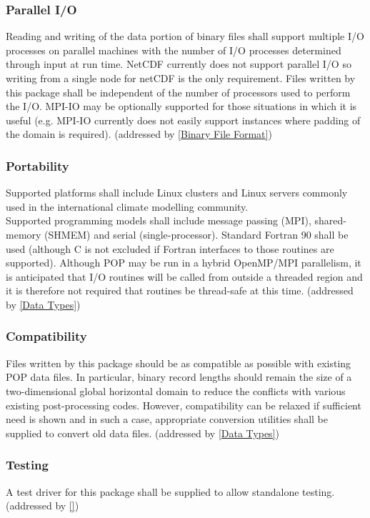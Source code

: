 \documentclass[11pt]{article}
\begin{document}
\subsubsection{Parallel I/O}
\label{Parallel I/O}
Reading and writing of the data portion of binary files
shall support multiple I/O processes on parallel machines
with the number of I/O processes determined through input at run time.
NetCDF currently does not support parallel I/O so writing
from a single node for netCDF is the only requirement.
Files written by this package shall be independent of the
number of processors used to perform the I/O.
MPI-IO may be optionally supported for those situations
in which it is useful (e.g. MPI-IO currently does not easily
support instances where padding of the domain is required).
(addressed by \ref{Binary File Format})

\subsubsection{Portability}
\label{Portability}
Supported platforms shall include Linux clusters and Linux servers
commonly used in the international climate modelling community.
\\
Supported programming models shall include message passing (MPI),
shared-memory (SHMEM) and serial (single-processor).
Standard Fortran 90 shall be used (although C is not excluded
if Fortran interfaces to those routines are supported).
Although POP may be run in a hybrid OpenMP/MPI parallelism,
it is anticipated that I/O routines will be called from
outside a threaded region and it is therefore not required
that routines be thread-safe at this time.
(addressed by \ref{Data Types})

\subsubsection{Compatibility}
\label{Compatibility}
Files written by this package should be as compatible as
possible with existing POP data files.
In particular, binary record lengths should remain the size
of a two-dimensional global horizontal domain to reduce the
conflicts with various existing post-processing codes.
However, compatibility can be relaxed if sufficient need is
shown and in such a case, appropriate conversion utilities
shall be supplied to convert old data files.
(addressed by \ref{Data Types})

\subsubsection{Testing}
\label{Testing}
A test driver for this package shall be supplied to allow standalone testing.
(addressed by \ref{})
\end{document}
